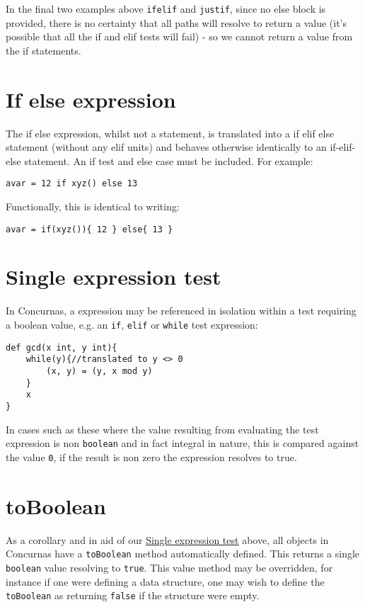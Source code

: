 \documentclass[conc-doc]{subfiles}
\begin{document}
In the final two examples above \lstinline{ifelif} and \lstinline{justif}, since no else block is provided, there is no certainty that all paths will resolve to return a value (it's possible that all the if and elif tests will fail) - so we cannot return a value from the if statements.


\section{If else expression}
The if else expression, whilst not a statement, is translated into a if elif else statement (without any elif units) and behaves otherwise identically to an if-elif-else statement. An if test and else case must be included. For example:

\begin{lstlisting}
avar = 12 if xyz() else 13
\end{lstlisting}

Functionally, this is identical to writing:

\begin{lstlisting}
avar = if(xyz()){ 12 } else{ 13 }
\end{lstlisting}

\section{Single expression test}
\label{sec:singleexprtest}
In Concurnas, a expression may be referenced in isolation within a test requiring a boolean value, e.g. an \lstinline{if}, \lstinline{elif} or \lstinline{while} test expression:

\begin{lstlisting}
def gcd(x int, y int){
	while(y){//translated to y <> 0
		(x, y) = (y, x mod y)
	}
	x
}
\end{lstlisting}

In cases such as these where the value resulting from evaluating the test expression is non \lstinline{boolean} and in fact integral in nature, this is compared against the value \lstinline{0}, if the result is non zero the expression resolves to true.

\section{toBoolean}
As a corollary and in aid of our \hyperref[sec:singleexprtest]{Single expression test} above, all objects in Concurnas have a \lstinline{toBoolean} method automatically defined. This returns a single \lstinline{boolean} value resolving to \lstinline{true}. This value method may be overridden, for instance if one were defining a data structure, one may wish to define the \lstinline{toBoolean} as returning \lstinline{false} if the structure were empty.
\end{document}

